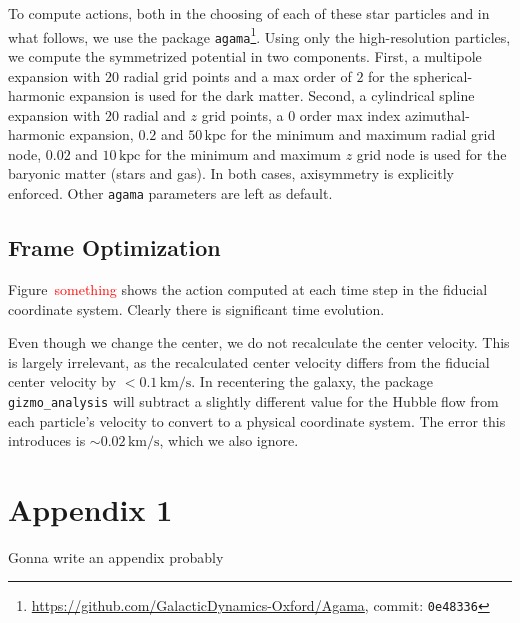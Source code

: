 \documentclass[twocolumn]{aastex62}
\newcommand{\Gus}[1]{\textcolor{red}{#1}}
\newcommand{\kpc}{\text{kpc}}
\newcommand{\kms}{\text{km}/\text{s}}
\begin{document}
To compute actions, both in the choosing of each of these star particles and
in what follows, we use the package
\texttt{agama}\footnote{\url{https://github.com/GalacticDynamics-Oxford/Agama},
commit: \texttt{0e48336}}. Using only the high-resolution particles, we
compute the symmetrized potential in two components. First, a multipole
expansion with $20$ radial grid points and a max order of $2$ for the
spherical-harmonic expansion is used for the dark matter. Second, a
cylindrical spline expansion with $20$ radial and $z$ grid points, a $0$ order
max index azimuthal-harmonic expansion, $0.2$ and $50\,\kpc$ for the minimum
and maximum radial grid node, $0.02$ and $10\,\kpc$ for the minimum and
maximum $z$ grid node is used for the baryonic matter (stars and gas). In both
cases, axisymmetry is explicitly enforced. Other \texttt{agama} parameters are
left as default.

\subsection{Frame Optimization} \label{ssec:frame_opt}
Figure~\Gus{something} shows the action computed at each time step in the
fiducial coordinate system. Clearly there is significant time evolution.

Even though we change the center, we do not recalculate the center velocity.
This is largely irrelevant, as the recalculated center velocity differs from
the fiducial center velocity by $<0.1\,\kms$. In recentering the galaxy, the
package \texttt{gizmo\_analysis} will subtract a slightly different value for
the Hubble flow from each particle's velocity to convert to a physical
coordinate system. The error this introduces is $\sim 0.02\,\kms$, which we
also ignore.

\appendix \section{Appendix 1}
Gonna write an appendix probably 


\end{document}
